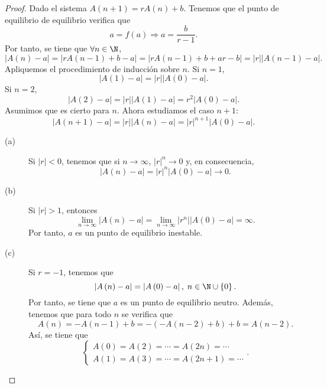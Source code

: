 \begin{proof}  Dado el sistema $\displaystyle A\left(n+1\right) = rA\left(n\right)+b $. Tenemos que el punto de equilibrio de equilibrio verifica que 
	\[a = f\left(a\right) \Rightarrow a = \frac{b}{r-1} .\]
	Por tanto, se tiene que $\displaystyle \forall n \in \N $, 
	\[ \left|A\left(n\right)-a\right| = \left|rA\left(n-1\right)+b-a\right| = \left|rA\left(n-1\right)+b+ar-b\right| = \left|r\right| \left|A\left(n-1\right)-a\right| .\]
	Apliquemos el procedimiento de inducción sobre $\displaystyle n $. Si $\displaystyle n = 1 $, 
	\[ \left|A\left(1\right) - a\right| = \left|r\right| \left|A\left(0\right)-a\right| .\]
	Si $\displaystyle n = 2 $, 
	\[ \left|A\left(2\right)-a\right| = \left|r\right| \left|A\left(1\right)-a\right| = r^{2} \left|A\left(0\right)-a\right| .\]
	Asumimos que es cierto para $\displaystyle n $. Ahora estudiamos el caso $\displaystyle n+1 $:
	\[ \left|A\left(n+1\right)-a\right| = \left|r\right| \left|A\left(n\right)-a\right| = \left|r\right|^{n+1} \left|A\left(0\right)-a\right| .\]
\begin{description}
	\item[(a)] Si $\displaystyle \left|r\right| < 0 $, tenemos que si $\displaystyle n \to \infty $, $\displaystyle \left|r\right|^{n} \to 0 $ y, en consecuencia, 
	\[ \left|A\left(n\right)-a\right| = \left|r\right|^{n} \left|A\left(0\right)-a\right| \to 0 .\]
\item[(b)] Si $\displaystyle \left|r\right| > 1 $, entonces
	\[\lim_{n \to \infty} \left|A\left(n\right)-a\right| = \lim_{n \to \infty} \left|r^{n}\right| \left|A\left(0\right)-a\right| = \infty .\]
	Por tanto, $\displaystyle a $ es un punto de equilibrio inestable.
\item[(c)] Si $\displaystyle r = - 1 $, tenemos que 
	\[ \left|A\left(n\right)-a\right| = \left|A\left(0\right)-a\right|, \; n \in \N\cup \left\{ 0\right\}  .\]
	Por tanto, se tiene que $\displaystyle a $ es un punto de equilibrio neutro. Además, tenemos que para todo $\displaystyle n $ se verifica que 
	\[A\left(n\right) = - A\left(n-1\right) + b = - \left(-A\left(n-2\right)+b\right)+b = A\left(n-2\right) .\]
	Así, se tiene que
	\[
	\begin{cases}
	A\left(0\right) = A\left(2\right) = \cdots = A\left(2n\right) = \cdots \\
	A\left(1\right) = A\left(3\right) = \cdots = A\left(2n+1\right) = \cdots 
	\end{cases}
	.\]
\end{description}
\end{proof}

